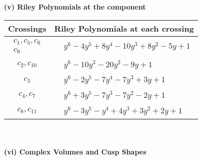 \documentclass[1p]{elsarticle_modified}
\theoremstyle{definition}
\begin{document}
\newpage\renewcommand{\arraystretch}{1}
\flushleft \textbf{(v) Riley Polynomials at the component}\newline \\
\begin{tabular}{m{50pt}|m{274pt}}
Crossings & \hspace{64pt}Riley Polynomials at each crossing \\
\hline $$\begin{aligned}c_{1},c_{5},c_{6}\\c_{9}\end{aligned}$$&$\begin{aligned}
&y^6-4 y^5+8 y^4-10 y^3+8 y^2-5 y+1
\end{aligned}$\\
\hline $$\begin{aligned}c_{2},c_{10}\end{aligned}$$&$\begin{aligned}
&y^6-10 y^3-20 y^2-9 y+1
\end{aligned}$\\
\hline $$\begin{aligned}c_{3}\end{aligned}$$&$\begin{aligned}
&y^6-2 y^5-7 y^4-7 y^3+3 y+1
\end{aligned}$\\
\hline $$\begin{aligned}c_{4},c_{7}\end{aligned}$$&$\begin{aligned}
&y^6+3 y^5-7 y^3-7 y^2-2 y+1
\end{aligned}$\\
\hline $$\begin{aligned}c_{8},c_{11}\end{aligned}$$&$\begin{aligned}
&y^6-3 y^5- y^4+4 y^3+3 y^2+2 y+1
\end{aligned}$\\
\hline
\end{tabular}\\~\\
\newpage\flushleft \textbf{(vi) Complex Volumes and Cusp Shapes}
\end{document}
